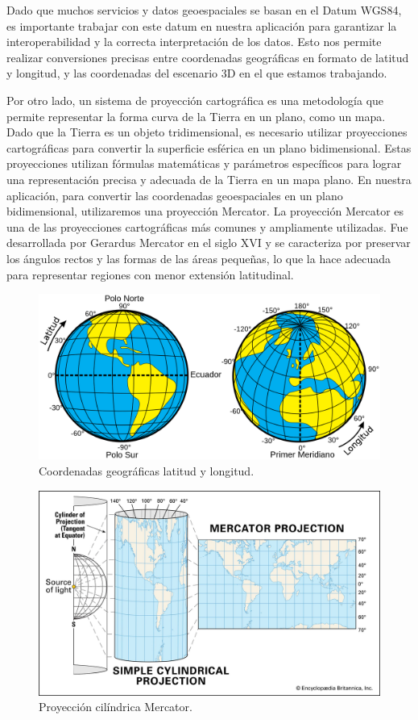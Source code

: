 \documentclass[a4paper, 11pt]{book}
\begin{document}
Dado que muchos servicios y datos geoespaciales se basan en el Datum WGS84, es importante trabajar con este datum en nuestra aplicación para garantizar la interoperabilidad y la correcta interpretación de los datos. Esto nos permite realizar conversiones precisas entre coordenadas geográficas en formato de latitud y longitud, y las coordenadas del escenario 3D en el que estamos trabajando.

Por otro lado, un sistema de proyección cartográfica es una metodología que permite representar la forma curva de la Tierra en un plano, como un mapa. Dado que la Tierra es un objeto tridimensional, es necesario utilizar proyecciones cartográficas para convertir la superficie esférica en un plano bidimensional. Estas proyecciones utilizan fórmulas matemáticas y parámetros específicos para lograr una representación precisa y adecuada de la Tierra en un mapa plano.
En nuestra aplicación, para convertir las coordenadas geoespaciales en un plano bidimensional, utilizaremos una proyección Mercator. La proyección Mercator es una de las proyecciones cartográficas más comunes y ampliamente utilizadas. Fue desarrollada por Gerardus Mercator en el siglo XVI y se caracteriza por preservar los ángulos rectos y las formas de las áreas pequeñas, lo que la hace adecuada para representar regiones con menor extensión latitudinal.
\begin{figure}[h]
  \centering
  \includegraphics[width=12cm, keepaspectratio]{img/Latitud_y_Longitud_en_la_Tierra.svg.png}
  \caption{Coordenadas geográficas latitud y longitud.}
  \label{fig:latlong}
\end{figure}

\begin{figure}[h]
  \centering
  \includegraphics[width=12cm, keepaspectratio]{img/simple-cylindrical-projection-earth-map-globe-mercator.jpg}
  \caption{Proyección cilíndrica Mercator.}
  \label{fig:mercator}
\end{figure}
\end{document}
